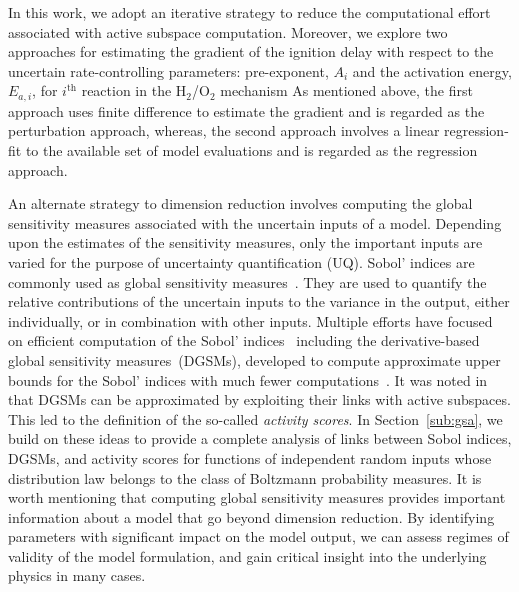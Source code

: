 In this work, we adopt an iterative strategy to reduce the computational effort
associated with active subspace computation. Moreover, we explore two approaches
for estimating the gradient of the ignition delay with respect to the uncertain
rate-controlling parameters: pre-exponent, $A_i$ and the activation energy, $E_{a,i}$,
for $i^{\text{th}}$ reaction in the H$_2$/O$_2$ mechanism 
As mentioned above, the
first approach uses finite difference to estimate the gradient and is regarded as
the perturbation approach, whereas, the second approach involves a linear
regression-fit to the available set of model evaluations and is regarded as
the regression approach. 

An alternate strategy to dimension reduction involves computing the global
sensitivity measures associated with the uncertain inputs of a model. Depending
upon the estimates of the sensitivity measures, only the important inputs are
varied for the purpose of uncertainty quantification (UQ). Sobol' indices are
commonly used as global sensitivity measures~\cite{Sobol:2001}. They are
used to quantify the relative contributions of the uncertain inputs to the variance
in the output, either individually, or in combination with other inputs. 
Multiple efforts have focused on efficient computation of the Sobol' 
indices~\cite{Sudret:2008,Plischke:2013,Tissot:2015,Li:2016} including the 
derivative-based global sensitivity measures~(DGSMs), developed to
compute approximate upper bounds for the Sobol' indices with much fewer
computations~\cite{Sobol:2009, Lamboni:2013}. It was noted
in~\cite{Diaz:2016,Constantine:2017} that DGSMs can be approximated by
exploiting their links with active subspaces. This led to the definition of the 
so-called \emph{activity scores}. In Section~\ref{sub:gsa}, we build on these
ideas to provide a complete analysis of links between Sobol indices, DGSMs, and
activity scores for functions of independent random inputs whose distribution
law belongs to the class of Boltzmann probability measures. 
It is worth mentioning that computing global sensitivity measures provides 
important information about a model that go beyond dimension reduction. By 
identifying parameters with significant impact on the model output, we can assess
regimes of validity of the model formulation, and gain critical insight into the
underlying physics in many cases. 

